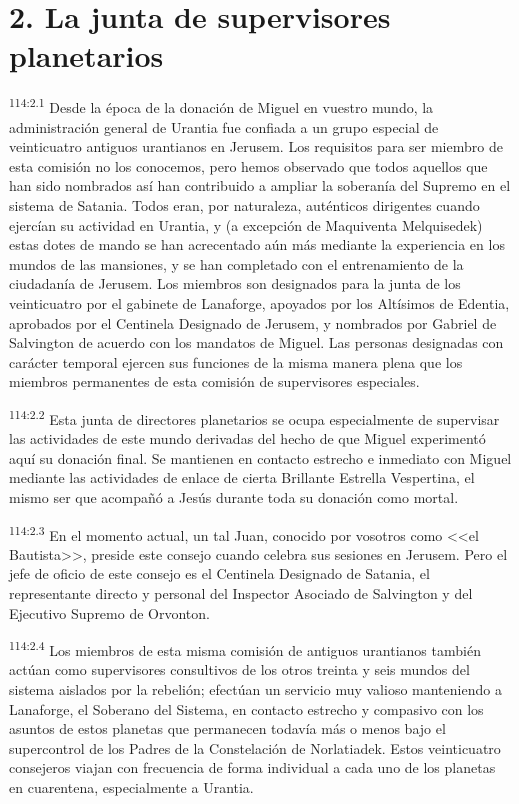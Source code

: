 \documentclass[twoside, 11pt]{book}
\begin{document}
\section*{2. La junta de supervisores planetarios}
\par
\textsuperscript{114:2.1} Desde la época de la donación de Miguel en vuestro mundo, la administración general de Urantia fue confiada a un grupo especial de veinticuatro antiguos urantianos en Jerusem. Los requisitos para ser miembro de esta comisión no los conocemos, pero hemos observado que todos aquellos que han sido nombrados así han contribuido a ampliar la soberanía del Supremo en el sistema de Satania. Todos eran, por naturaleza, auténticos dirigentes cuando ejercían su actividad en Urantia, y (a excepción de Maquiventa Melquisedek) estas dotes de mando se han acrecentado aún más mediante la experiencia en los mundos de las mansiones, y se han completado con el entrenamiento de la ciudadanía de Jerusem. Los miembros son designados para la junta de los veinticuatro por el gabinete de Lanaforge, apoyados por los Altísimos de Edentia, aprobados por el Centinela Designado de Jerusem, y nombrados por Gabriel de Salvington de acuerdo con los mandatos de Miguel. Las personas designadas con carácter temporal ejercen sus funciones de la misma manera plena que los miembros permanentes de esta comisión de supervisores especiales.

\par
\textsuperscript{114:2.2} Esta junta de directores planetarios se ocupa especialmente de supervisar las actividades de este mundo derivadas del hecho de que Miguel experimentó aquí su donación final. Se mantienen en contacto estrecho e inmediato con Miguel mediante las actividades de enlace de cierta Brillante Estrella Vespertina, el mismo ser que acompañó a Jesús durante toda su donación como mortal.

\par
\textsuperscript{114:2.3} En el momento actual, un tal Juan, conocido por vosotros como <<el Bautista>>, preside este consejo cuando celebra sus sesiones en Jerusem. Pero el jefe de oficio de este consejo es el Centinela Designado de Satania, el representante directo y personal del Inspector Asociado de Salvington y del Ejecutivo Supremo de Orvonton.

\par
\textsuperscript{114:2.4} Los miembros de esta misma comisión de antiguos urantianos también actúan como supervisores consultivos de los otros treinta y seis mundos del sistema aislados por la rebelión; efectúan un servicio muy valioso manteniendo a Lanaforge, el Soberano del Sistema, en contacto estrecho y compasivo con los asuntos de estos planetas que permanecen todavía más o menos bajo el supercontrol de los Padres de la Constelación de Norlatiadek. Estos veinticuatro consejeros viajan con frecuencia de forma individual a cada uno de los planetas en cuarentena, especialmente a Urantia.
\end{document}
